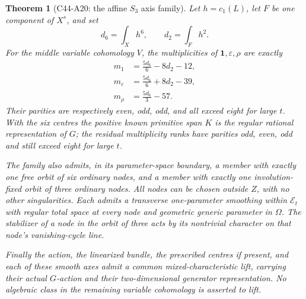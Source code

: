 \documentclass[11pt]{article}
\newtheorem{theorem}{Theorem}[section]
\theoremstyle{remark}\newtheorem{remark}[theorem]{Remark}
\begin{document}
\begin{theorem}[C44-A20: the affine $S_3$ axis family]
Let $h=c_1(L)$, let $F$ be one component of $X^s$, and set
\[
                 d_6=\int_Xh^6,\qquad d_2=\int_Fh^2.
\]
For the middle variable cohomology $V$, the multiplicities
of $\mathbf1,\varepsilon,\rho$ are exactly
\[
 \begin{split}
 m_1&=\frac{5d_6}{6}-8d_2-12,\\
 m_\varepsilon&=\frac{5d_6}{6}+8d_2-39,\\
 m_\rho&=\frac{5d_6}{3}-57.
 \end{split}                                                     \tag{A20.5}
\]
Their parities are respectively even, odd, odd, and
all exceed eight for large $t$.
With the six centres the positive known primitive span
$K$ is the regular rational representation of $G$;
the residual multiplicity ranks have parities odd,
even, odd and still exceed eight for large $t$.

The family also admits, in its parameter-space boundary,
a member with exactly one free orbit of six ordinary
nodes, and a member with exactly one involution-fixed
orbit of three ordinary nodes. All nodes can be chosen
outside $Z$, with no other singularities. Each admits
a transverse one-parameter smoothing within $\mathcal E_t$
with regular total space at every node and geometric
generic parameter in $\Omega$. The stabilizer of a node
in the orbit of three acts by its nontrivial character
on that node's vanishing-cycle line.

Finally the action, the linearized bundle, the prescribed
centres if present, and each of these smooth axes admit
a common mixed-characteristic lift, carrying their
actual $G$-action and their two-dimensional generator
representation. No algebraic class in the remaining
variable cohomology is asserted to lift.
\end{theorem}
\end{document}
